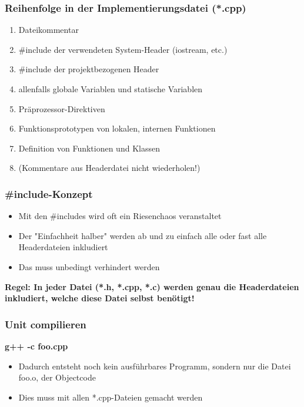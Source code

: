 \subsubsection{Reihenfolge in der Implementierungsdatei (*.cpp)}
\label{sec:Reihenfolge in der Implementierungsdatei}
\begin{enumerate}
	\item Dateikommentar
	\item \#include der verwendeten System-Header (iostream, etc.)
	\item \#include der projektbezogenen Header
	\item allenfalls globale Variablen und statische Variablen
	\item Präprozessor-Direktiven
	\item Funktionsprototypen von lokalen, internen Funktionen
	\item Definition von Funktionen und Klassen
	\item[\-] \color{red} (Kommentare aus Headerdatei nicht wiederholen!)
\end{enumerate}

\subsubsection{\#include-Konzept}
\label{sec:include-Konzept}
\begin{itemize}
	\item Mit den \#includes wird oft ein Riesenchaos veranstaltet
	\item Der "Einfachheit halber" werden ab und zu einfach alle oder fast alle Headerdateien inkludiert
	\item Das muss unbedingt verhindert werden
\end{itemize}
\textbf{Regel: In jeder Datei (*.h, *.cpp, *.c) werden genau die Headerdateien inkludiert, welche diese Datei selbst benötigt!}

\subsubsection{Unit compilieren}
\label{sec:Unit compilieren}
\begin{center}
	\textbf{g++ \color{red}-c\color{black} foo.cpp}
\end{center}
\begin{itemize}
	\item Dadurch entsteht noch kein ausführbares Programm, sondern nur die Datei foo.o, der Objectcode
	\item Dies muss mit allen *.cpp-Dateien gemacht werden
\end{itemize}


